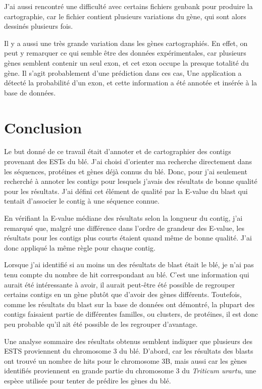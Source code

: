 \documentclass[10.9pt]{article} %
\begin{document}
J'ai aussi rencontré une difficulté avec certains fichiers genbank pour produire la cartographie, car le fichier contient plusieurs
variations du gène, qui sont alors dessinés plusieurs fois.

Il y a aussi une très grande variation dans les gènes cartographiés. En effet, on peut y remarquer ce qui semble être des données
expérimentales, car plusieurs gènes semblent contenir un seul exon, et cet exon occupe la presque totalité du gène. Il s'agit probablement
d'une prédiction dans ces cas, Une application a détecté la probabilité d'un exon, et cette information a été annotée et insérée
à la base de données.



\section{Conclusion}

Le but donné de ce travail était d'annoter et de cartographier des contigs provenant des ESTs du blé. J'ai choisi d'orienter
ma recherche directement dans les séquences, protéines et gènes déjà connus du blé. Donc, pour j'ai seulement recherché à annoter
les contigs pour lesquels j'avais des résultats de bonne qualité pour les résultats. J'ai défini cet élément de qualité par la
E-value du blast qui tentait d'associer le contig à une séquence connue. 

En vérifiant la E-value médiane des résultats selon la longueur du contig, j'ai remarqué que, malgré une différence dans l'ordre
de grandeur des E-value, les résultats pour les contigs plus courts étaient quand même de bonne qualité. J'ai donc appliqué la même
règle pour chaque contig.

Lorsque j'ai identifié si au moins un des résultats de blast était le blé, je n'ai pas tenu compte du nombre de hit correspondant
au blé. C'est une information qui aurait été intéressante à avoir, il aurait peut-être été possible de regrouper certains contigs
en un gène plutôt que d'avoir des gènes différents. Toutefois, comme les résultats du blast sur la base de données ont démontré, 
la plupart des contigs faisaient partie de différentes familles, ou clusters, de protéines, il est donc peu probable qu'il ait été
possible de les regrouper d'avantage.

Une analyse sommaire des résultats obtenus semblent indiquer que plusieurs des ESTS proviennent du chromosome 3 du blé. D'abord, car
les résultats des blasts ont trouvé un nombre de hits pour le chromosome 3B, mais aussi car les gènes identifiés proviennent en grande
partie du chromosome 3 du \emph{Triticum urartu}, une espèce utilisée pour tenter de prédire les gènes du blé.
\end{document}
